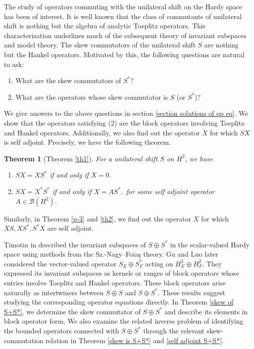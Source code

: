 \documentclass[12pt, reqno]{amsart}
\newtheorem*{theorem*}{Theorem}
\theoremstyle{definition}
\theoremstyle{remark}
\numberwithin{equation}{section}
\begin{document}
    The study of operators commuting with the unilateral shift on the Hardy space has been of interest. 
    It is well known that the class of commutants of unilateral shift is nothing but the algebra of analytic Toeplitz operators. This characterization underlines much of the subsequent theory of invariant subspaces and model theory. The skew commutators of the unilateral shift $S$ are nothing but the Hankel operators. Motivated by this, the following questions are natural to ask: 
    \begin{enumerate}
        \item What are the skew commutators of $S^*$?
        \item What are the operators whose skew commutator is $S$ (or $S^*$)?
    \end{enumerate}
    We give answers to the above questions in section \ref{section solutions of op eq}. 
    We show that the operators satisfying (2) are
    the block operators involving Toeplitz and Hankel operators.
    Additionally, we also find out the operator $X$ for which $SX$ is self adjoint. 
    Precisely, we have the following theorem.
    \begin{theorem*}[Theorem \ref{th1}]
        For a unilateral shift $S$ on $H^2$, we have
        \begin{enumerate}
            \item  $SX=XS^*$ if and only if $X=0$.
            \item $SX=X^*S^*$ if and only if $X=AS^*,$ for some self adjoint operator $A \in \mathcal{B}(H^2)$.
            \end{enumerate}
    \end{theorem*}
    Similarly, in Theorem \ref{p-3} and \ref{th2}, 
    we find out the operator 
    $X$ for which $XS, XS^*,S^*X$ are self adjoint.
    
     Timotin in \cite{DT} described the invariant subspaces of \(S \oplus S^{*}\) 
    in the scalar-valued Hardy space using methods from the 
    Sz.-Nagy--Foiaş theory. Gu and Luo \cite{CGSL} later considered the 
vector-valued operator
$S_{E} \oplus S_{F}^*$
acting on \(H_{E}^{2} \oplus H_{F}^{2}\). They expressed its invariant 
subspaces as kernels or ranges of block operators whose entries involve 
Toeplitz and Hankel operators. These block operators arise naturally as
intertwiners between \(S \oplus S\) and \(S \oplus S^{*}\). These results suggest studying the corresponding operator equations 
directly. In Theorem \ref{skew of S+S*}, we determine the skew commutator of 
$S \oplus S^*$ and describe its elements in block operator form. 
We also examine the related inverse problem of identifying the bounded 
operators connected with $S \oplus S^*$ through the relevant 
skew-commutation relation in Theorem \ref{skew is S+S*} and \ref{self adjoint S+S*}. 
   
\end{document}
